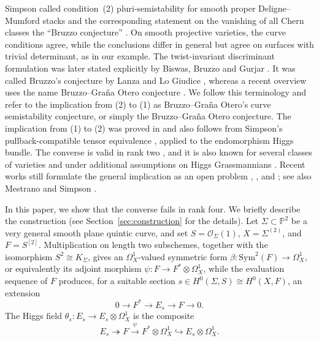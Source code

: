 \documentclass[oneside,11pt]{amsart}
\theoremstyle{definition}
\theoremstyle{remark}
\numberwithin{thm}{section}
\numberwithin{equation}{section}
\begin{document}
Simpson called condition~(2) pluri-semistability for smooth proper Deligne--Mumford stacks and the corresponding statement on the vanishing of  all Chern classes the ``Bruzzo conjecture''
\cite[Definition~9.2 and Conjecture~9.5]{Sim11}.  On smooth projective varieties, the curve conditions agree, while the conclusions differ in general but agree on surfaces with trivial determinant, as in our example.
The twist-invariant discriminant formulation was later stated explicitly by Biswas, Bruzzo and Gurjar \cite[Conjecture~1.2]{BBG19}.  It was called Bruzzo's conjecture by Lanza and Lo Giudice \cite{LLG17}, whereas a recent overview uses the name Bruzzo--Gra\~na Otero conjecture \cite[Conjecture~1]{Cap26a}.  We follow this terminology and refer to the implication from (2) to (1) as Bruzzo--Gra\~na Otero's curve semistability conjecture, or simply the Bruzzo--Gra\~na Otero conjecture.  The implication from (1) to (2) was proved in \cite[Theorem~4.7]{BGO11} and also follows from Simpson's pullback-compatible tensor equivalence \cite[Corollary~3.10 and the discussion following it]{Sim92}, applied to the endomorphism Higgs bundle.  The converse is valid in rank two \cite[Theorem~4.8]{BGHR23}, and it is also known for several classes of varieties and under additional assumptions on Higgs Grassmannians \cite{BLG16,BLLG19,BP22,BC23}.  Recent works still formulate the general implication as an open problem \cite[Section~2]{BCGO26}, \cite[Conjecture~1]{Cap26a}, and \cite[Conjecture~2.5]{Cap26b}; see also Mestrano and Simpson \cite[Section~12, p.~121]{MS16}.

In this paper, we show that the converse fails in rank four.  We briefly describe the construction (see Section~\ref{sec:construction} for the details).  Let $\Sigma\subset\mathbb{P}^2$ be a very general smooth plane quintic curve, and set $S=\mathcal{O}_\Sigma(1)$, $X=\Sigma^{(2)}$, and $F=S^{[2]}$.  Multiplication on length two subschemes, together with the isomorphism $S^2\cong K_\Sigma$, gives an $\Omega_X^1$-valued symmetric form $\beta: \mathrm{Sym}^2(F)\longrightarrow\Omega_X^1$, or equivalently its adjoint morphism $\psi:F\longrightarrow F^*\otimes\Omega_X^1$, while the evaluation sequence of $F$ produces, for a suitable section $s\in H^0(\Sigma,S)\cong H^0(X,F)$, an extension
\[
 0\longrightarrow F^*\longrightarrow E_s\longrightarrow F
 \longrightarrow0.
\]
The Higgs field $\theta_s:E_s\to E_s\otimes\Omega_X^1$ is the composite
\[
E_s\twoheadrightarrow F\xrightarrow{\psi}
 F^*\otimes\Omega_X^1\hookrightarrow E_s\otimes\Omega_X^1.
\]
\end{document}
